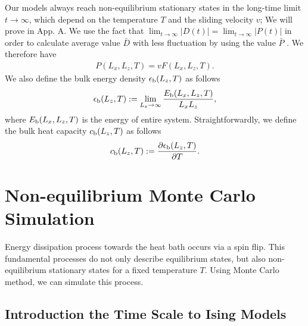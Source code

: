 Our models always reach non-equilibrium stationary states in the long-time limit $t\to\infty$, which depend on the temperature $T$ and the sliding velocity $v$; We will prove in App. A. We use the fact that $\lim_{t\to\infty}|D(t)|=\lim_{t\to\infty}|P(t)|$ in order to calculate average value $\bar{D}$ with less fluctuation by using the value $\bar{P}$ \cite{Magiera2009a, Magiera2011, Magiera2011b}. We therefore have
\begin{align}
P(L_{x}, L_{z}, T)=vF(L_{x}, L_{z}, T)\label{for:frictionalforce2}.
\end{align}
We also define the bulk energy density $\epsilon_{\rm b}(L_{z}, T)$ as follows
\begin{align}
\epsilon_{\rm b}(L_{z}, T):=\lim_{L_{x}\to\infty}\frac{E_{\rm b}(L_{x}, L_{z}, T)}{L_{x}L_{z}},
\end{align}
where $E_{\rm b}(L_{x}, L_{z}, T)$ is the energy of entire system. Straightforwardly, we define the bulk heat capacity $c_{\rm b}(L_{z}, T)$ as follows
\begin{align}
c_{\rm b}(L_{z}, T):=\frac{\partial \epsilon_{\rm b}(L_{z}, T)}{\partial T}.
\end{align}

\section{Non-equilibrium Monte Carlo Simulation}

Energy dissipation process towards the heat bath occurs via a spin flip. This fundamental processes do not only describe equilibrium states, but also non-equilibrium stationary states for a fixed temperature $T$\cite{Glauber1963}. Using Monte Carlo method, we can simulate this process.

\subsection{Introduction the Time Scale to Ising Models}

